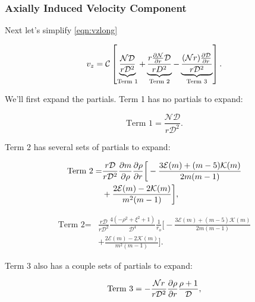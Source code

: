 \subsubsection{Axially Induced Velocity Component}

Next let's simplify \cref{eqn:vzlong}

\begin{equation}
v_z = \mathcal{C}\left[\underbrace{\frac{\mathcal{N}\mathcal{D}}{r\mathcal{D}^2}}_\text{Term 1} + \underbrace{\frac{r\pd{\mathcal{N}}{r}\mathcal{D}}{rD^2}}_\text{Term 2} - \underbrace{\frac{(\mathcal{N}r)\pd{\mathcal{D}}{r}}{r\mathcal{D}^2}}_\text{Term 3}\right].
\end{equation}

\noindent We'll first expand the partials.
%
Term 1 has no partials to expand:

\begin{equation}
    \text{Term 1} = \frac{\mathcal{N}\mathcal{D}}{r\mathcal{D}^2}.
\end{equation}

\noindent Term 2 has several sets of partials to expand:

\begin{equation}
    \begin{split}
    \text{Term 2} =& \frac{r\mathcal{D}}{r\mathcal{D}^2} \frac{\partial m}{\partial \rho}\frac{\partial \rho}{\partial r} \bigg[ -\frac{3\mathcal{E}(m) + (m-5)\mathcal{K}(m)}{2m(m-1)} \\
         &+ \frac{2\mathcal{E}(m) - 2\mathcal{K}(m)}{m^2(m-1)} \bigg],
    \end{split}
\end{equation}

\begin{equation}
    \begin{split}
        \text{Term 2} =& \frac{r\mathcal{D}}{r\mathcal{D}^2} \frac{4(-\rho^2+\xi^2 +1)}{\mathcal{D}^4}\frac{1}{r_o} \bigg[ -\frac{3\mathcal{E}(m) + (m-5)\mathcal{K}(m)}{2m(m-1)} \\
         &+ \frac{2\mathcal{E}(m) - 2\mathcal{K}(m)}{m^2(m-1)} \bigg].
    \end{split}
\end{equation}

\noindent Term 3 also has a couple sets of partials to expand:

\begin{equation}
        \text{Term 3} = -\frac{\mathcal{N}r}{r\mathcal{D}^2}\frac{\partial \rho}{\partial r}\frac{\rho+1}{\mathcal{D}},
\end{equation}

